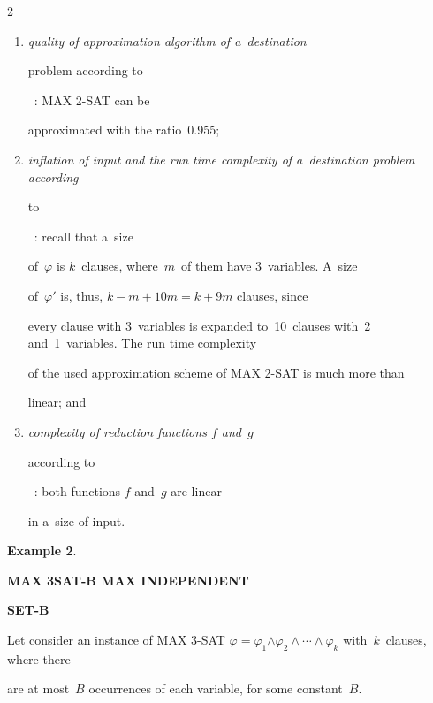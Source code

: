 \begin{multicols}{2}
\begin{enumerate}[(1)]
\item {\it quality of approximation algorithm of a~destination


problem according to}~\cite{H1997}: {MAX 2-SAT} can be


approximated with the ratio~0.955;


\item {\it inflation of input and the run time complexity of a~destination problem according


to}~\cite{AP2005}: recall that a~size


of~$\varphi$ is $k$~clauses, where~$m$~of them have 3~variables. A~size


of~$\varphi'$ is, thus, $k - m + 10m = k + 9m$ clauses, since


every clause with 3~variables is expanded to~10~clauses with~2 and~1~variables. The run time complexity


of the used approximation scheme of {MAX 2-SAT} is much more than


linear; and


\item {\it complexity of reduction functions $f$ and~$g$


according to}~\cite{AP2005}: both functions $f$ and~$g$ are linear


in a~size of input.


\end{enumerate}





\noindent


\textbf{Example 2}.\


 \textbf{MAX 3SAT-B {} MAX INDEPENDENT}





\hspace*{34pt}\textbf{SET-B}





 \smallskip





\noindent


Let consider an instance of MAX 3-SAT $\varphi = \varphi_1$\linebreak $ \wedge


\varphi_2 \wedge\cdots\wedge \varphi_k$ with~$k$~clauses, where there


are at most~$B$ occurrences of each variable, for some constant~$B$.



\end{multicols}

